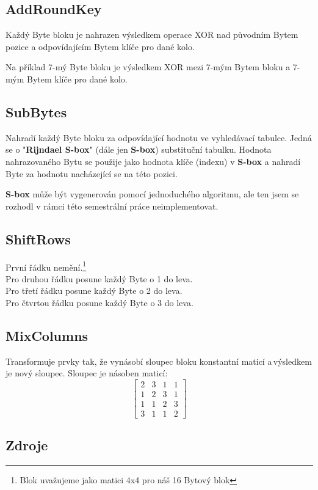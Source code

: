 \documentclass[12pt]{article}
\begin{document}
\subsection{AddRoundKey}
Každý Byte bloku je nahrazen výsledkem operace XOR nad původním Bytem pozice a
odpovídajícím Bytem klíče pro dané kolo.

Na příklad 7-mý Byte bloku je výsledkem XOR mezi 7-mým Bytem bloku a 7-mým Bytem
klíče pro dané kolo.
%
\subsection{SubBytes}
Nahradí každý Byte bloku za odpovídající hodnotu ve vyhledávací tabulce. Jedná
se o "\textbf{Rijndael S-box}" (dále jen \textbf{S-box}) substituční tabulku.
Hodnota nahrazovaného Bytu se použije jako hodnota klíče (indexu) v 
\textbf{S-box} a nahradí Byte za hodnotu nacházející se na této pozici.

\textbf{S-box} může být vygenerován pomocí jednoduchého algoritmu, ale ten
jsem se rozhodl v rámci této semestrální práce neimplementovat.
%
\subsection{ShiftRows}
\noindent První řádku nemění.\footnote{Blok uvažujeme jako matici 4x4 pro náš
	16 Bytový blok}\\
Pro druhou řádku posune každý Byte o 1 do leva.\\
Pro třetí řádku posune každý Byte o 2 do leva.\\
Pro čtvrtou řádku posune každý Byte o 3 do leva.\\
%
\subsection{MixColumns}
Transformuje prvky tak, že vynásobí sloupec bloku konstantní maticí a\,výsledkem
je nový sloupec. Sloupec je násoben maticí:
\begin{equation*}
	\begin{bmatrix}
		2 & 3 & 1 & 1\\
		1 & 2 & 3 & 1\\
		1 & 1 & 2 & 3\\
		3 & 1 & 1 & 2
	\end{bmatrix}
\end{equation*}
%
\pagebreak
%
\subsection{Zdroje}
\end{document}
